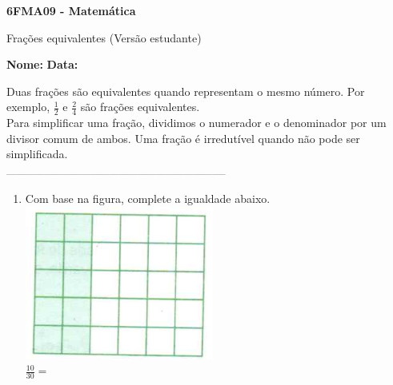 \documentclass[a4paper,14pt]{article}
\begin{document}
	
	\noindent\textbf{6FMA09 - Matemática} 
	
	\begin{center}Frações equivalentes (Versão estudante)
	\end{center}
	
	\noindent\textbf{Nome:} \underline{\hspace{10cm}}
	\noindent\textbf{Data:} \underline{\hspace{4cm}}
	
	
	\begin{multicols}{2}
		\noindent Duas frações são equivalentes quando representam o mesmo número. Por exemplo, $\frac{1}{2}$ e $\frac{2}{4}$ são frações equivalentes. \\
		Para simplificar uma fração, dividimos o numerador e o denominador por um divisor comum de ambos. Uma fração é irredutível quando não pode ser simplificada. \\
		\noindent\textsubscript{-----------------------------------------------------------------------}
		\begin{enumerate} 
			\item Com base na figura, complete a igualdade abaixo.
			\includegraphics[width=1\linewidth]{6FMA09_imagens/imagem1}
			\\
			$\frac{10}{30} = $ \\

\end{enumerate}
\end{multicols}
\end{document}

